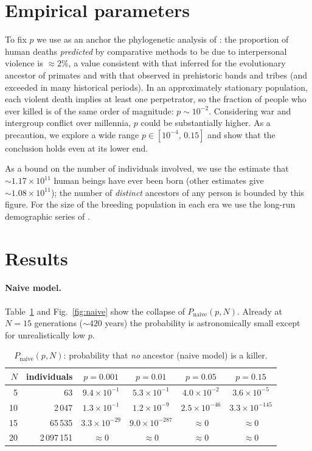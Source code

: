 \documentclass[11pt]{article}
\begin{document}
\section{Empirical parameters}\label{sec:param}

To fix $p$ we use as an anchor the phylogenetic analysis of \citet{gomez2016}:
the proportion of human deaths \emph{predicted} by comparative methods to be due
to interpersonal violence is $\approx 2\%$, a value consistent with that inferred
for the evolutionary ancestor of primates and with that observed in prehistoric
bands and tribes (and exceeded in many historical periods). In an approximately
stationary population, each violent death implies at least one perpetrator, so
the fraction of people who ever killed is of the same order of magnitude:
$p \sim 10^{-2}$. Considering war and intergroup conflict over millennia, $p$
could be substantially higher. As a precaution, we explore a wide range
$p \in [10^{-4},\, 0{.}15]$ and show that the conclusion holds even at its lower
end.

As a bound on the number of individuals involved, we use the estimate that
$\sim 1{.}17\times 10^{11}$ human beings have ever been born \citep{prb2022}
(other estimates give $\sim 1{.}08\times 10^{11}$); the number of \emph{distinct}
ancestors of any person is bounded by this figure. For the size of the breeding
population in each era we use the long-run demographic series of
\citet{owid2023population}.

\section{Results}

\paragraph{Naive model.} Table~\ref{tab:naive} and Fig.~\ref{fig:naive} show the
collapse of $P_{\text{naive}}(p,N)$. Already at $N=15$ generations
($\sim 420$ years) the probability is astronomically small except for unrealistically
low $p$.

\begin{table}[h]
\centering
\caption{$P_{\text{naive}}(p,N)$: probability that \emph{no} ancestor (naive
model) is a killer.}
\label{tab:naive}
\begin{tabular}{rrcccc}
\toprule
$N$ & individuals & $p=0{.}001$ & $p=0{.}01$ & $p=0{.}05$ & $p=0{.}15$ \\
\midrule
5  & 63        & $9{.}4\times10^{-1}$ & $5{.}3\times10^{-1}$ & $4{.}0\times10^{-2}$ & $3{.}6\times10^{-5}$ \\
10 & 2\,047    & $1{.}3\times10^{-1}$ & $1{.}2\times10^{-9}$ & $2{.}5\times10^{-46}$ & $3{.}3\times10^{-145}$ \\
15 & 65\,535   & $3{.}3\times10^{-29}$ & $9{.}0\times10^{-287}$ & $\approx 0$ & $\approx 0$ \\
20 & 2\,097\,151 & $\approx 0$ & $\approx 0$ & $\approx 0$ & $\approx 0$ \\
\bottomrule
\end{tabular}
\end{table}
\end{document}
